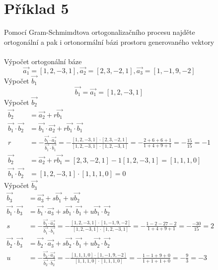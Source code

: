 \begin{figure}
\section*{Příklad 5}
Pomocí Gram-Schmimdtova ortogonalizačního procesu najděte ortogonální a pak i ortonormální bázi prostoru generovaného vektory \\\\
Výpočet ortogonální báze
$$
  \vec{a_1} = [1, 2, -3, 1],
  \vec{a_2} = [2,3, -2, 1],
  \vec{a_3} = [1, -1, 9, -2]
$$
Výpočet $\vec{b_1}$
$$
  \vec{b_1} = \vec{a_1} = [1, 2, -3, 1]
$$
Výpočet $\vec{b_2}$
\begin{equation*}
    \begin{aligned}
  \vec{b_2} &= \vec{a_2} + r \vec{b_1} \\
  \vec{b_1} \cdot \vec{b_2} &= \vec{b_1} \cdot \vec{a_2} + r \vec{b_1} \cdot \vec{b_1} \\
  r &= - \frac{\vec{b_1} \cdot \vec{a_2}}{\vec{b_1} \cdot \vec{b_1}}
  = - \frac{[1, 2, -3, 1] \cdot [2,3, -2, 1]}{[1, 2, -3, 1] \cdot [1, 2, -3, 1]}
  = - \frac{2 + 6 + 6 + 1}{1 + 4 + 9 + 1}
  = - \frac{15}{15}
  = -1 \\
  \vec{b_2} &= \vec{a_2} + r \vec{b_1} = [2,3, -2, 1] - 1 [1, 2, -3, 1] = [1, 1, 1, 0] \\
  \vec{b_1} \cdot \vec{b_2} &= [1, 2, -3, 1] \cdot [1, 1, 1, 0] = 0
    \end{aligned}
\end{equation*}
Výpočet $\vec{b_3}$
\begin{equation*}
    \begin{aligned}
  \vec{b_3} &= \vec{a_3} + s \vec{b_1} + u \vec{b_2} \\
  \vec{b_1} \cdot \vec{b_3} &= \vec{b_1} \cdot \vec{a_3} + s \vec{b_1} \cdot \vec{b_1} + u \vec{b_1} \cdot \vec{b_2} \\
  s &= - \frac{\vec{b_1} \cdot \vec{a_3}}{\vec{b_1} \cdot \vec{b_1}}
  = - \frac{[1, 2, -3, 1] \cdot [1, -1, 9, -2]}{[1, 2, -3, 1] \cdot [1, 2, -3, 1]} 
  = - \frac{1 -2 -27 -2}{1 + 4 + 9 + 1} = -\frac{-30}{15} = 2 \\
  \vec{b_2} \cdot \vec{b_3} &= \vec{b_2} \cdot \vec{a_3} + s \vec{b_2} \cdot \vec{b_1} + u \vec{b_2} \cdot \vec{b_2} \\
  u &= - \frac{\vec{b_2} \cdot \vec{a_3}}{\vec{b_2} \cdot \vec{b_2}}
  = -\frac{[1, 1, 1, 0] \cdot [1, -1, 9, -2]}{[1, 1, 1, 0] \cdot [1, 1, 1, 0]}
  = -\frac{1 -1 + 9 + 0}{1 + 1 + 1 + 0} = -\frac{9}{3} = -3 \\

\end{aligned}
\end{equation*}
\end{figure}
